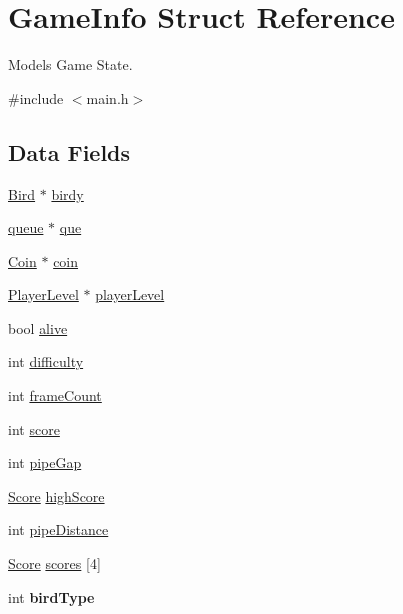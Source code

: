 \hypertarget{struct_game_info}{}\section{Game\+Info Struct Reference}
\label{struct_game_info}


Models Game State.  




{\ttfamily \#include $<$main.\+h$>$}

\subsection*{Data Fields}
\begin{DoxyCompactItemize}
\item 
\hyperlink{struct_bird}{Bird} $\ast$ \hyperlink{struct_game_info_aee4a8447023b7f3f3ceb9588cd84c7ce}{birdy}
\item 
\hyperlink{structqueue}{queue} $\ast$ \hyperlink{struct_game_info_ae921d4765b1a89b5fcf7ca5a5462bfbf}{que}
\item 
\hyperlink{struct_coin}{Coin} $\ast$ \hyperlink{struct_game_info_a7aa65ed4a2ab803f3cad3a2eb1e0947b}{coin}
\item 
\hyperlink{struct_player_level}{Player\+Level} $\ast$ \hyperlink{struct_game_info_a7c1f3db004a89ba5384af9a54abd1f46}{player\+Level}
\item 
bool \hyperlink{struct_game_info_a47a0b9a98cef651d98214b126d6ed7ec}{alive}
\item 
int \hyperlink{struct_game_info_ae502ef89edb1039e4bd2e703f8d407b4}{difficulty}
\item 
int \hyperlink{struct_game_info_afd418f5a5bdde1773c8ba201340cd71c}{frame\+Count}
\item 
int \hyperlink{struct_game_info_ac46b9867fe4baf039bb1ebb132f1168f}{score}
\item 
int \hyperlink{struct_game_info_a35dd3f7cc8f29de98575321a8c710d9e}{pipe\+Gap}
\item 
\hyperlink{struct_score}{Score} \hyperlink{struct_game_info_aad280f82718715eb41462a5d3f290594}{high\+Score}
\item 
int \hyperlink{struct_game_info_a948bb38de6f9b40bf6b44c5b56f80a75}{pipe\+Distance}
\item 
\hyperlink{struct_score}{Score} \hyperlink{struct_game_info_a5bd798bc489729fd6fd44ba615cefb7c}{scores} \mbox{[}4\mbox{]}
\item 
\mbox{\label{struct_game_info_ae4666e5199b67e492b3617e6fd41d459}} 
int {\bfseries bird\+Type}
\end{DoxyCompactItemize}


